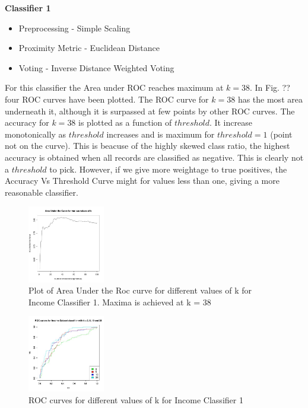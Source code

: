 \textbf{Classifier 1}
	\begin{itemize}
		\item Preprocessing - Simple Scaling
		\item Proximity Metric - Euclidean Distance
		\item Voting - Inverse Distance Weighted Voting
	\end{itemize}
	For this classifier the Area under ROC reaches maximum at $k = 38$. In Fig. ?? four ROC curves have been plotted. The ROC curve for $k=38$ has the most area underneath it, although it is surpassed at few points by other ROC curves. The accuracy for $k=38$ is plotted as a function of $threshold$. It increase monotonically as $threshold$ increases and is maximum for $threshold=1$ (point not on the curve). This is beacuse of the highly skewed class ratio, the highest accuracy is obtained when all records are classified as negative. This is clearly not a $threshold$ to pick. However, if we give more weightage to true positives, the Accuracy Vs Threshold Curve might for values less than one, giving a more reasonable classifier. \\
	\begin{figure}[h]
		\label{fig:classifier1_auc}
		\caption{Plot of Area Under the Roc curve for different values of k for Income Classifier 1. Maxima is achieved at k = 38}
		\centering
		\includegraphics[width=0.3\textwidth]{images/income_classifier1/auc.jpg}
	\end{figure}	
	\begin{figure}
		\label{fig:classifier1_roc}
		\caption{ROC curves for different values of k for Income Classifier 1}
		\centering
		\includegraphics[width=0.3\textwidth]{images/income_classifier1/roc.jpg}
	\end{figure}
